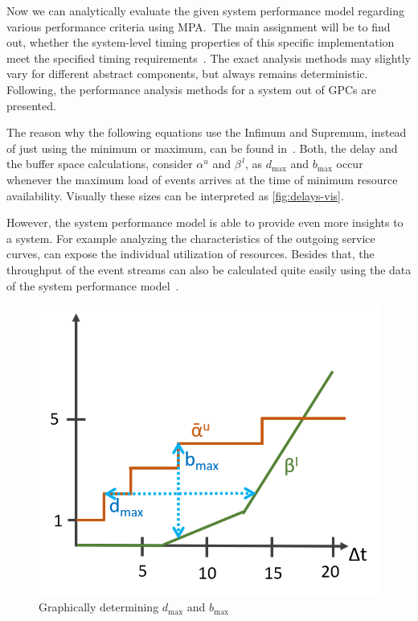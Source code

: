 \label{performanceAnalysis}

Now we can analytically evaluate the given system performance model regarding various performance criteria using MPA.\
The main assignment will be to find out, whether the system-level timing properties of this specific implementation meet the specified timing requirements~\cite{wan:05}.
The exact analysis methods may slightly vary for different abstract components, but always remains deterministic.
Following, the performance analysis methods for a system out of GPCs are presented.

The reason why the following equations use the Infimum and Supremum, instead of just using the minimum or maximum, can be found in~\cite{cru}.
Both, the delay and the buffer space calculations, consider \(\alpha ^{u}\) and \(\beta ^{\, l}\),
as \(d_{\max}\) and \(b_{\max}\) occur whenever the maximum load of events arrives at the time of minimum resource availability.
Visually these sizes can be interpreted as \autoref{fig:delays-vis}.

However, the system performance model is able to provide even more insights to a system.
For example analyzing the characteristics of the outgoing service curves, can expose the individual utilization of resources.
Besides that, the throughput of the event streams can also be calculated quite easily using the data of the system performance model~\cite{wan:06}.

\begin{figure}
    \centering
    \includegraphics[width=0.7\columnwidth]{graphics/delays_vis.png}
    \caption{Graphically determining \(d_{\max}\) and \(b_{\max}\)}\label{fig:delays-vis}
\end{figure}

